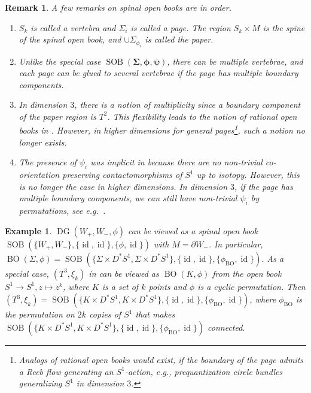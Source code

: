 \documentclass[11pt]{amsart}
\numberwithin{equation}{section}
\newtheorem{remark}[theorem]{\textbf{Remark}}
\newtheorem{example}[theorem]{\textbf{Example}}
\DeclareMathOperator{\Id}{id}
\DeclareMathOperator{\BO}{BO}
\DeclareMathOperator{\SOB}{SOB}
\DeclareMathOperator{\DG}{DG}
\begin{document}
\begin{remark}\label{rmk:spinal}
    A few remarks on spinal open books are in order.
    \begin{enumerate}
        \item $S_k$ is called a \emph{vertebra} and $\Sigma_i$ is called a \emph{page}. The region $S_k\times M$ is the \emph{spine} of the spinal open book, and $\cup \Sigma_{\phi_i}$ is called the \emph{paper}. 
        \item Unlike the special case $\SOB(\bm{\Sigma},\bm{\phi},\bm{\psi})$, there can be multiple vertebrae, and each page can be glued to several vertebrae if the page has multiple boundary components. 
        \item In dimension $3$, there is a notion of multiplicity \cite[Definition 1.3]{lisi2018symplectic} since a boundary component of the paper region is $T^2$. This flexibility leads to the notion of rational open books in \cite{BEV}. However, in higher dimensions for general pages\footnote{Analogs of rational open books would exist, if the boundary of the page admits a Reeb flow generating an $S^1$-action, e.g., prequantization circle bundles generalizing $S^1$ in dimension $3$.}, such a notion no longer exists.
        \item The presence of $\psi_i$ was implicit in \cite{lisi2018symplectic} because there are no non-trivial co-orientation preserving contactomorphisms of $S^1$ up to isotopy. However, this is no longer the case in higher dimensions. In dimension $3$, if the page has multiple boundary components, we can still have non-trivial $\psi_i$ by permutations, see e.g.\ .
    \end{enumerate}
\end{remark}

\begin{example}\label{ex:BO=SOB}
    $\DG(W_+,W_-,\phi)$ can be viewed as a spinal open book $\SOB(\{W_+,W_-\},\{\Id,\Id\},\{\phi,\Id\})$ with $M=\partial W_-$. In particular, $\BO(\Sigma,\phi) = \SOB(\{\Sigma \times D^*S^1,\Sigma \times D^*S^1\},\{\Id,\Id\},\{\phi_{\BO},\Id\})$. As a special case, $(T^3,\xi_k)$ in \cite{Eli96} can be viewed as $\BO(K,\phi)$ from the open book $S^1\to S^1, z\mapsto z^k$, where $K$ is a set of $k$ points and $\phi$ is a cyclic permutation. Then $(T^3,\xi_k)=\SOB(\{K \times D^*S^1,K \times D^*S^1\},\{\Id,\Id\},\{\phi_{\BO},\Id\})$, where $\phi_{\BO}$ is the permutation on $2k$ copies of $S^1$ that makes $\SOB(\{K \times D^*S^1,K \times D^*S^1\},\{\Id,\Id\},\{\phi_{\BO},\Id\})$ connected.
\end{example}
\end{document}
